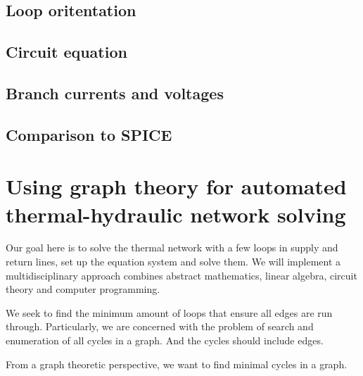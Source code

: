 \documentclass[11pt, oneside, reqno]{amsart}
\numberwithin{equation}{section}
\theoremstyle{plain}%
\theoremstyle{definition}
\theoremstyle{remark}
\begin{document}
\subsection{Loop oritentation}

\subsection{Circuit equation}

\subsection{Branch currents and voltages}

\subsection{Comparison to SPICE}

\section{Using graph theory for automated thermal-hydraulic network solving}
Our goal here is to solve the thermal network with a few loops in supply and return lines, set up the equation system and solve them. We will implement a multidisciplinary approach combines abstract mathematics, linear algebra, circuit theory and computer programming.

We seek to find the minimum amount of loops that ensure all edges are run through. Particularly, we are concerned with the problem of search and enumeration of all cycles in a graph. And the cycles should include edges. 

From a graph theoretic perspective, we want to find minimal cycles in a graph.
\end{document}
